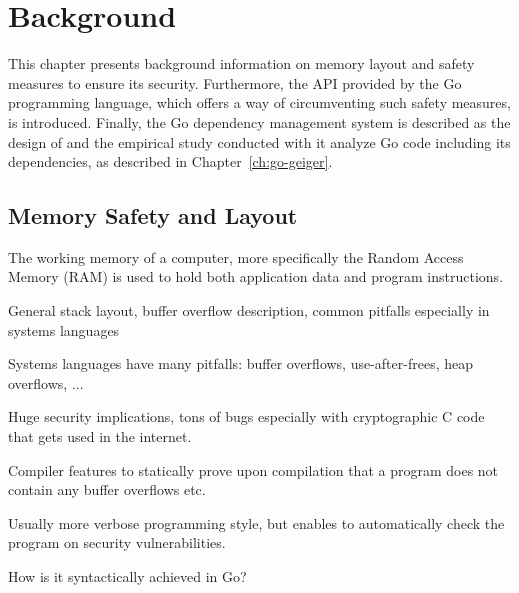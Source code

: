 
\chapter{Background}\label{ch:background}

This chapter presents background information on memory layout and safety measures to ensure its security.
Furthermore, the \unsafe{} \acrshort{API} provided by the Go programming language, which offers a way of circumventing
such safety measures, is introduced.
Finally, the Go dependency management system is described as the design of \toolGeiger{} and the empirical study
conducted with it analyze Go code including its dependencies, as described in Chapter~\ref{ch:go-geiger}.



\section{Memory Safety and Layout}\label{sec:background:memory-safety-layout}

The working memory of a computer, more specifically the Random Access Memory (\acrshort{RAM}) is used to hold both
application data and program instructions.

General stack layout, buffer overflow description, common pitfalls especially in systems languages




Systems languages have many pitfalls: buffer overflows, use-after-frees, heap overflows, ...

Huge security implications, tons of bugs especially with cryptographic C code that gets
used in the internet.

Compiler features to statically prove upon compilation that a program does not contain any
buffer overflows etc.

Usually more verbose programming style, but enables to automatically check the program
on security vulnerabilities.

How is it syntactically achieved in Go?




